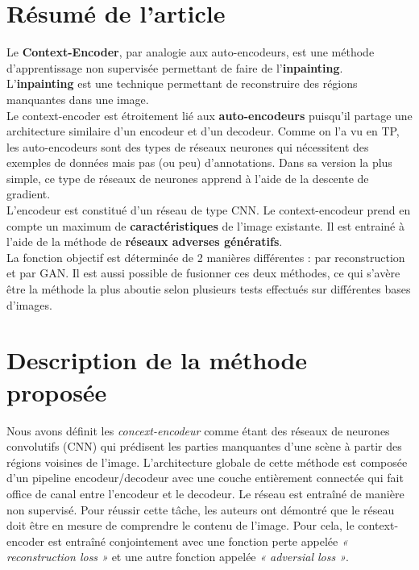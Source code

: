 \documentclass[11pt,a4paper]{article}
\begin{document}
    \section{Résumé de l'article}
    Le \textbf{Context-Encoder}, par analogie aux auto-encodeurs, est une méthode d'apprentissage non supervisée permettant de faire de l'\textbf{inpainting}. L'\textbf{inpainting} est une technique permettant de reconstruire des régions manquantes dans une image. \\
    Le context-encoder est étroitement lié aux \textbf{auto-encodeurs} puisqu’il partage une architecture similaire d’un encodeur et d’un decodeur. Comme on l’a vu en TP, les auto-encodeurs sont des types de réseaux neurones qui nécessitent des exemples de données mais pas (ou peu) d’annotations. Dans sa version la plus simple, ce type de réseaux de neurones apprend à l’aide de la descente de gradient.\\
    L'encodeur est constitué d'un réseau de type CNN.
    Le context-encodeur prend en compte un maximum de \textbf{caractéristiques} de l'image existante. Il est entrainé à l'aide de la méthode de \textbf{réseaux adverses génératifs}.\\
    La fonction objectif est déterminée de 2 manières différentes : par reconstruction et par GAN. Il est aussi possible de fusionner ces deux méthodes, ce qui s'avère être la méthode la plus aboutie selon plusieurs tests effectués sur différentes bases d'images.\\
    
    
    \section{Description de la 	méthode proposée}
    Nous avons définit les \emph{concext-encodeur} comme étant des réseaux de neurones convolutifs (CNN) qui prédisent les parties manquantes d’une scène à partir des régions voisines de l’image. L’architecture globale de cette méthode est composée d’un pipeline encodeur/decodeur avec une couche entièrement connectée qui fait office de canal entre l’encodeur et le decodeur. Le réseau est entraîné de manière non supervisé. Pour réussir cette tâche, les auteurs ont démontré que le réseau doit être en mesure de comprendre le contenu de l’image. Pour cela, le context-encoder est entraîné conjointement avec une fonction perte appelée \emph{« reconstruction loss »}  et une autre fonction appelée \emph{« adversial loss »}.
\end{document}
